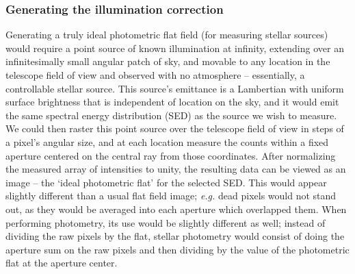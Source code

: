 \documentclass[12pt,preprint]{aastex}
\begin{document}


\subsubsection{Generating the illumination correction}
\label{sec:ic}

Generating a truly ideal photometric flat field (for measuring stellar
sources) would require a point source of known illumination at
infinity, extending over an infinitesimally small angular patch of
sky, and movable to any location in the telescope field of view and
observed with no atmosphere -- essentially, a controllable stellar
source. This source's emittance is a Lambertian with uniform surface
brightness that is independent of location on the sky, and it would
emit the same spectral energy distribution (SED) as the source we wish
to measure. We could then raster this point source over the telescope
field of view in steps of a pixel's angular size, and at each location
measure the counts within a fixed aperture centered on the central ray
from those coordinates.  After normalizing the measured array of
intensities to unity, the resulting data can be viewed as an image --
the `ideal photometric flat' for the selected SED.  This would appear
slightly different than a usual flat field image; {\it e.g.} dead
pixels would not stand out, as they would be averaged into each
aperture which overlapped them. When performing photometry, its use
would be slightly different as well; instead of dividing the raw
pixels by the flat, stellar photometry would consist of doing the
aperture sum on the raw pixels and then dividing by the value of the
photometric flat at the aperture center.
\end{document}
